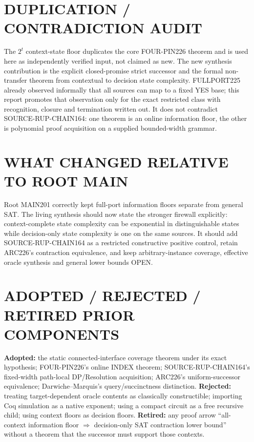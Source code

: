 \documentclass[11pt]{article}
\begin{document}
\section{DUPLICATION / CONTRADICTION AUDIT}
The $2^t$ context-state floor duplicates the core FOUR-PIN226 theorem and is
used here as independently verified input, not claimed as new.  The new
synthesis contribution is the explicit closed-promise strict successor and the
formal non-transfer theorem from contextual to decision state complexity.
FULLPORT225 already observed informally that all sources can map to a fixed YES
base; this report promotes that observation only for the exact restricted
class with recognition, closure and termination written out.  It does not
contradict SOURCE-RUP-CHAIN164: one theorem is an online information floor, the
other is polynomial proof acquisition on a supplied bounded-width grammar.

\section{WHAT CHANGED RELATIVE TO ROOT MAIN}
Root MAIN201 correctly kept full-port information floors separate from general
SAT.  The living synthesis should now state the stronger firewall explicitly:
context-complete state complexity can be exponential in distinguishable states
while decision-only state complexity is one on the same sources.  It should add
SOURCE-RUP-CHAIN164 as a restricted constructive positive control, retain
ARC226's contraction equivalence, and keep arbitrary-instance coverage,
effective oracle synthesis and general lower bounds OPEN.

\section{ADOPTED / REJECTED / RETIRED PRIOR COMPONENTS}
\textbf{Adopted:} the static connected-interface coverage theorem under its
exact hypothesis; FOUR-PIN226's online INDEX theorem; SOURCE-RUP-CHAIN164's
fixed-width path-local DP/Resolution acquisition; ARC226's uniform-successor
equivalence; Darwiche--Marquis's query/succinctness distinction.
\textbf{Rejected:} treating target-dependent oracle contents as classically
constructible; importing Coq simulation as a native exponent; using a compact
circuit as a free recursive child; using context floors as decision floors.
\textbf{Retired:} any proof arrow ``all-context information floor $\Rightarrow$
decision-only SAT contraction lower bound'' without a theorem that the
successor must support those contexts.
\end{document}
